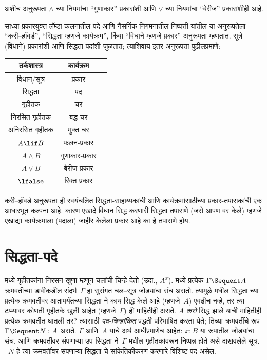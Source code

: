 अशीच अनुरूपता $\land$ च्या नियमांचा ``गुणाकार''
प्रकारांशी आणि $\lor$ च्या नियमांचा ``बेरीज'' प्रकारांशीही आहे.

साध्या प्रकारयुक्त लॅम्डा कलनातील पदे आणि नैसर्गिक निगमनातील
निष्पत्ती यांतील या अनुरूपतेला ``करी--हॉवर्ड'',
``सिद्धता म्हणजे कार्यक्रम'', किंवा ``विधाने म्हणजे प्रकार''
अनुरूपता म्हणतात. सूत्रे (विधाने) प्रकारांशी आणि
सिद्धता पदांशी जुळतात; त्याशिवाय इतर अनुरूपता पुढीलप्रमाणे:
\begin{center}
  \begin{tabular}{c c c}
    तर्कशास्त्र & कार्यक्रम \\
    \hline
    विधान/सूत्र & प्रकार \\
    सिद्धता & पद \\
    गृहीतक & चर \\
    निरसित गृहीतक & बद्ध चर \\
    अनिरसित गृहीतक & मुक्त चर \\
    $A \lif B$ & फलन-प्रकार \\
    $A \land B$ & गुणाकार-प्रकार \\
    $A \lor B$ & बेरीज-प्रकार \\
    $\lfalse$ & रिक्त प्रकार \\
    \hline
  \end{tabular}
\end{center}

करी--हॉवर्ड अनुरूपता ही स्वयंचलित सिद्धता-साहाय्यकांची आणि
कार्यक्रमांसाठीच्या प्रकार-तपासकांची एक आधारभूत कल्पना आहे.
कारण एखादे विधान सिद्ध करणारी सिद्धता तपासणे (जसे आपण वर केले)
म्हणजे एखाद्या कार्यक्रमाला (पदाला) जाहीर केलेला प्रकार आहे का
हे तपासणे होय.












\section{सिद्धता-पदे}\label{int:pty:ter:sec}

 मध्ये गृहीतकांना निरसन-खुणा म्हणून चलांची
चिन्हे देतो (उदा., $A^x$).  मध्ये प्रत्येक
$\Gamma \Sequent A$ क्रमवर्तीच्या डावीकडील संदर्भ~$\Gamma$
हा सुसंगत चल–सूत्र जोड्यांचा संच असतो. त्यामुळे
 मधील सिद्धता च्या प्रत्येक क्रमवर्तीवर
आतापर्यंतच्या सिद्धता ने काय सिद्ध केले आहे
(म्हणजे~$A$) एवढीच नव्हे, तर त्या टप्प्यावर कोणती
गृहीतके खुली आहेत (म्हणजे~$\Gamma$) ही माहितीही असते.
$A$ \emph{कसे} सिद्ध झाले याची माहितीही प्रत्येक
क्रमवर्तीत घातली तर? त्यासाठी \emph{पद-चिन्हांकित}
 पद्धती परिभाषित करता येते; तिच्या
क्रमवर्तींचे रूप $\Gamma \Sequent N : A$ असते.
$\Gamma$ आणि~$A$ यांचे अर्थ आधीप्रमाणेच आहेत:
$x: B$ या रूपातील जोड्यांचा संच, आणि क्रमवर्तीवर
संपणाऱ्या उप-सिद्धता ने~$\Gamma$ मधील गृहीतकांवरून
निष्पन्न होते असे दाखवलेले सूत्र. ~$N$ हे त्या
क्रमवर्तीवर संपणाऱ्या सिद्धता चे सांकेतिकीकरण करणारे
विशिष्ट पद असेल.

